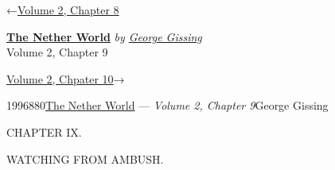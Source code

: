 \hypertarget{headerContainer}{}
\hypertarget{navigationHeader}{}
\protect\hypertarget{headerprevious}{}{←\href{/wiki/The_Nether_World/Volume_2/Chapter_8}{Volume
2, Chapter 8}}

\textbf{\protect\hypertarget{header_title_text}{}{\href{/wiki/The_Nether_World}{The
Nether World}}} \emph{by
\href{/wiki/Author:George_Gissing}{\protect\hypertarget{header_author_text}{}{{George
Gissing}}}}\\
\protect\hypertarget{header_section_text}{}{Volume 2, Chapter 9}

\protect\hypertarget{headernext}{}{\href{/wiki/The_Nether_World/Volume_2/Chapter_10}{Volume
2, Chpater 10}→}

\hypertarget{navigationNotes}{}

\hypertarget{ws-data}{}
\protect\hypertarget{ws-article-id}{}{1996880}\protect\hypertarget{ws-title}{}{\href{/wiki/The_Nether_World}{The
Nether World} --- \emph{Volume 2, Chapter
9}}\protect\hypertarget{ws-author}{}{George Gissing}

{\protect\hypertarget{174}{}{}}

{CHAPTER IX.}

WATCHING FROM AMBUSH.

